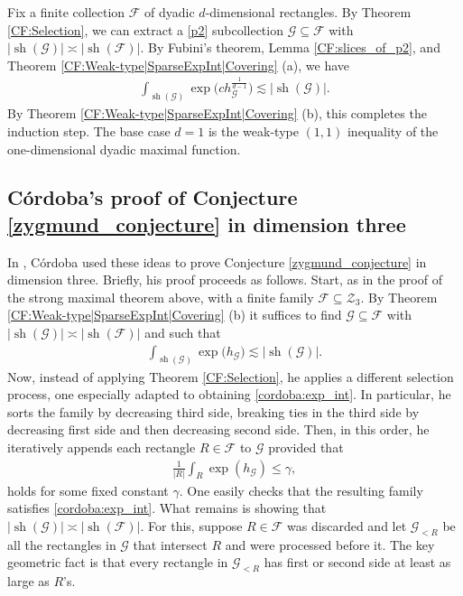 \documentclass[oneside]{amsart}
\theoremstyle{definition}
\theoremstyle{plain}
\numberwithin{equation}{section}
\numberwithin{theorem}{section}
\newcommand{\sh}{\operatorname{sh}}
\begin{document}
Fix a finite collection $\mathcal{F}$ of dyadic $d$-dimensional rectangles.
By Theorem \ref{CF:Selection}, we can extract a \eqref{p2} subcollection
$\mathcal{G} \subseteq \mathcal{F}$ with
$|\sh(\mathcal{G})| \asymp |\sh(\mathcal{F})|$.
By Fubini's theorem, Lemma \ref{CF:slices_of_p2}, and Theorem
\ref{CF:Weak-type|SparseExpInt|Covering} (a), we have
\begin{align*}
  \int_{\sh(\mathcal{G})} \exp\Big(c h_{\mathcal{G}}^{\frac{1}{d-1}}\Big)
    \lesssim |\sh(\mathcal{G})|.
\end{align*}
By Theorem \ref{CF:Weak-type|SparseExpInt|Covering} (b), this completes the
induction step.
The base case $d=1$ is the weak-type $(1,1)$ inequality of the one-dimensional
dyadic maximal function.

\subsection{Córdoba's proof of Conjecture \ref{zygmund_conjecture} in dimension
three}

In \cite{Cordoba1979}, Córdoba used these ideas to prove Conjecture
\ref{zygmund_conjecture} in dimension three.
Briefly, his proof proceeds as follows.
Start, as in the proof of the strong maximal theorem above, with a finite family
$\mathcal{F} \subseteq \mathcal{Z}_3$.
By Theorem \ref{CF:Weak-type|SparseExpInt|Covering} (b) it suffices to find
$\mathcal{G} \subseteq \mathcal{F}$ with
$|\sh(\mathcal{G})| \asymp |\sh(\mathcal{F})|$ and such that
\begin{align} \label{cordoba:exp_int}
  \int_{\sh(\mathcal{G})} \exp\big(h_{\mathcal{G}}\big)
    \lesssim |\sh(\mathcal{G})|.
\end{align}
Now, instead of applying Theorem \ref{CF:Selection}, he applies a different
selection process, one especially adapted to obtaining \eqref{cordoba:exp_int}.
In particular, he sorts the family by decreasing third side, breaking ties in
the third side by decreasing first side and then decreasing second side.
Then, in this order, he iteratively appends each rectangle $R \in \mathcal{F}$
to $\mathcal{G}$ provided that
\begin{align*}
  \frac{1}{|R|}\int_{R} \exp(h_{\mathcal{G}}) \leq \gamma,
\end{align*}
holds for some fixed constant $\gamma$.
One easily checks that the resulting family satisfies \eqref{cordoba:exp_int}.
What remains is showing that $|\sh(\mathcal{G})| \asymp |\sh(\mathcal{F})|$.
For this, suppose $R \in \mathcal{F}$ was discarded and let $\mathcal{G}_{<R}$
be all the rectangles in $\mathcal{G}$ that intersect $R$ and were processed
before it.
The key geometric fact is that every rectangle in $\mathcal{G}_{<R}$ has first
or second side at least as large as $R$'s.
\end{document}
